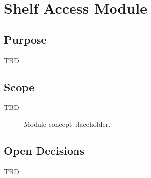 \chapter{Shelf Access Module}

\section{Purpose}

TBD

\section{Scope}

TBD

\begin{figure}[h]
\centering
{}
\caption{Module concept placeholder.}
\end{figure}


\section{Open Decisions}

TBD
